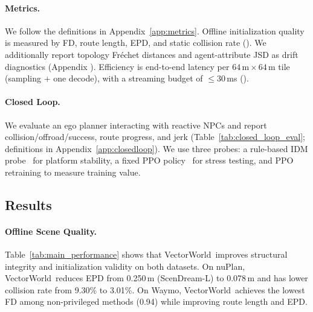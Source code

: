 \documentclass{article}
\newcommand{\VectorWorld}{VectorWorld}
\theoremstyle{plain}
\theoremstyle{definition}
\theoremstyle{remark}
\begin{document}
\paragraph{Metrics.}
We follow the definitions in Appendix~\ref{app:metrics}.
Offline initialization quality is measured by FD, route length, EPD, and static collision rate ().
We additionally report topology Fr\'echet distances and agent-attribute JSD as drift diagnostics (Appendix ).
Efficiency is end-to-end latency per \(64\,\mathrm{m}\times 64\,\mathrm{m}\) tile (sampling + one decode), with a streaming budget of \(\le 30\)\,ms ().

\paragraph{Closed Loop.}
We evaluate an ego planner interacting with reactive NPCs and report collision/offroad/success, route progress, and jerk (Table~\ref{tab:closed_loop_eval}; definitions in Appendix~\ref{app:closedloop}).
We use three probes: a rule-based IDM probe~\cite{treiber2000congested} for platform stability, a fixed PPO policy~\cite{schulman2017proximal} for stress testing, and PPO retraining to measure training value.

\subsection{Results}
\label{sec:exp_results}

\paragraph{Offline Scene Quality.}
Table~\ref{tab:main_performance} shows that \VectorWorld\ improves structural integrity and initialization validity on both datasets.
On nuPlan, \VectorWorld\ reduces EPD from 0.250\,m (ScenDream-L) to 0.078\,m and has lower collision rate from 9.30\% to 3.01\%.
On Waymo, \VectorWorld\ achieves the lowest FD among non-privileged methods (0.94) while improving route length and EPD.

\end{document}
